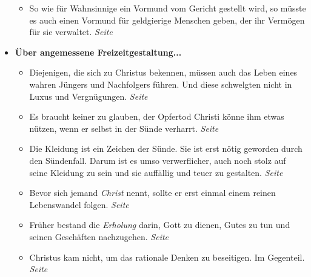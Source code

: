 \begin{itemize}
\begin{itemize}
 \item So wie für Wahnsinnige ein Vormund vom Gericht gestellt wird, so
müsste es auch einen Vormund für geldgierige Menschen geben, der ihr Vermögen für
sie verwaltet.
 \dotfill \textit{Seite~\pageref{ref:13_22_wahnsinnige}}\\

 \end{itemize}

 \item \textbf{Über angemessene Freizeitgestaltung...}

\begin{itemize}
 \item Diejenigen, die sich zu Christus bekennen, müssen auch das Leben eines
wahren Jüngers und Nachfolgers führen. Und diese schwelgten nicht in Luxus und
Vergnügungen.
 \dotfill \textit{Seite~\pageref{ref:14_01_wahre_nachfolger}}\\

 \item Es braucht keiner zu glauben, der Opfertod Christi könne ihm etwas
nützen, wenn er selbst in der Sünde verharrt.
 \dotfill \textit{Seite~\pageref{ref:14_01_wahre_nachfolger_suenetod}}\\

 \item Die Kleidung ist ein Zeichen der Sünde. Sie ist erst nötig geworden durch
den Sündenfall. Darum ist es umso verwerflicher, auch noch stolz auf seine
Kleidung zu sein und sie auffällig und teuer zu gestalten.
 \dotfill \textit{Seite~\pageref{ref:14_04_wahre_nachfolger_kleidung}}\\

 \item Bevor sich jemand \textit{Christ} nennt, sollte er erst einmal einem reinen
Lebenswandel folgen.
 \dotfill \textit{Seite~\pageref{ref:14_06_wahre_nachfolger_umkehr}}\\

 \item Früher bestand die \textit{Erholung} darin, Gott zu dienen, Gutes zu tun
und seinen Geschäften nachzugehen.
 \dotfill \textit{Seite~\pageref{ref:14_07_wahre_nachfolger_erholung}}\\

 \item Christus kam nicht, um das rationale Denken zu beseitigen. Im Gegenteil.
 \dotfill \textit{Seite~\pageref{ref:14_08_wahre_nachfolger_rational}}\\


\end{itemize}
\end{itemize}
